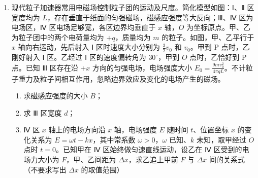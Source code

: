 \documentclass[\gkver]{gaokaozhenti}
\begin{document}
\begin{enumerate}
{（3）设从释放到弹簧恢复原长的过程中，A 向左、B 向右沿桌面滑行的距离分别为 $\Delta x_{A}$、$\Delta x_{B}$。这一阶段弹簧释放的弹性势能等于两物块增加的动能与克服摩擦力所做的功之和，即

$\Delta E_{p} = \frac{1}{2}m_{A}v_{A}^{2} + \frac{1}{2}m_{B}v_{B}^{2} + \mu m_{A}g\Delta x_{A} + \mu m_{B}g\Delta x_{B}$

其中 $m_{A} = m_{B}$，$\Delta x = \Delta x_{A} + \Delta x_{B}$

解得整个过程中，弹簧释放的弹性势能

$\Delta E_{p} = 0.12 \UJ$
}

\item
现代粒子加速器常用电磁场控制粒子团的运动及尺度。简化模型如图：Ⅰ、Ⅱ 区宽度均为 $L$，存在垂直于纸面的匀强磁场，磁感应强度等大反向；Ⅲ、Ⅳ 区为电场区，Ⅳ 区电场足够宽，各区边界均垂直于 $x$ 轴，$O$ 为坐标原点。甲、乙为粒子团中的两个电荷量均为 $+q$，质量均为 $m$ 的粒子。如图，甲、乙平行于 $x$ 轴向右运动，先后射入 Ⅰ 区时速度大小分别为 $\frac{3}{2}v_{0}$ 和 $v_{0}$。甲到 P 点时，乙刚好射入 Ⅰ 区。乙经过 Ⅰ 区的速度偏转角为 $30^\circ$，甲到 $O$ 点时，乙恰好到 P 点。已知 Ⅲ 区存在沿 $+x$ 方向的匀强电场，电场强度大小 $E_{0} = \frac{9mv_{0}^{2}}{4\pi qL}$。不计粒子重力及粒子间相互作用，忽略边界效应及变化的电场产生的磁场。
\begin{enumerate}
	\item
	求磁感应强度的大小 $B$；
	\item
	求 Ⅲ 区宽度 $d$；
	\item
	Ⅳ 区 $x$ 轴上的电场方向沿 $x$ 轴，电场强度 $E$ 随时间 $t$、位置坐标 $x$ 的变化关系为 $E = \omega t - kx$，其中常系数 $\omega > 0$，$\omega$ 已知、$k$ 未知，取甲经过 $O$ 点时 $t = 0$。已知甲在 Ⅳ 区始终做匀速直线运动，设乙在 Ⅳ 区受到的电场力大小为 $F$，甲、乙间距为 $\Delta x$，求乙追上甲前 $F$ 与 $\Delta x$ 间的关系式（不要求写出 $\Delta x$ 的取值范围）
\end{enumerate}
\end{enumerate}
\end{document}
